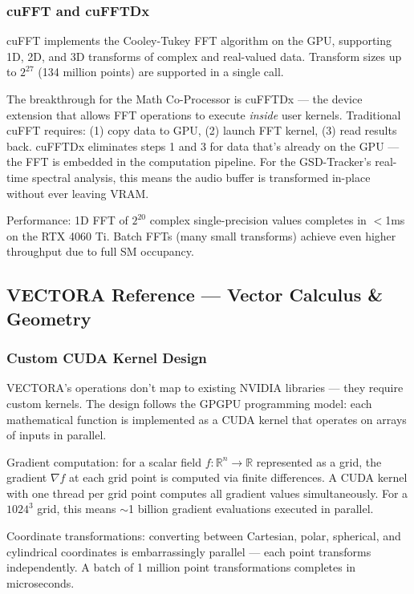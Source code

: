 \documentclass[11pt,letterpaper]{article}
\begin{document}
\subsubsection{cuFFT and cuFFTDx}

cuFFT implements the Cooley-Tukey FFT algorithm on the GPU, supporting 1D, 2D, and 3D transforms of complex and real-valued data. Transform sizes up to $2^{27}$ (134 million points) are supported in a single call.

The breakthrough for the Math Co-Processor is cuFFTDx --- the device extension that allows FFT operations to execute \textit{inside} user kernels. Traditional cuFFT requires: (1) copy data to GPU, (2) launch FFT kernel, (3) read results back. cuFFTDx eliminates steps 1 and 3 for data that's already on the GPU --- the FFT is embedded in the computation pipeline. For the GSD-Tracker's real-time spectral analysis, this means the audio buffer is transformed in-place without ever leaving VRAM.

Performance: 1D FFT of $2^{20}$ complex single-precision values completes in $<$1ms on the RTX 4060 Ti. Batch FFTs (many small transforms) achieve even higher throughput due to full SM occupancy.

\subsection{VECTORA Reference --- Vector Calculus \& Geometry}

\subsubsection{Custom CUDA Kernel Design}

VECTORA's operations don't map to existing NVIDIA libraries --- they require custom kernels. The design follows the GPGPU programming model: each mathematical function is implemented as a CUDA kernel that operates on arrays of inputs in parallel.

Gradient computation: for a scalar field $f: \mathbb{R}^n \rightarrow \mathbb{R}$ represented as a grid, the gradient $\nabla f$ at each grid point is computed via finite differences. A CUDA kernel with one thread per grid point computes all gradient values simultaneously. For a $1024^3$ grid, this means $\sim$1 billion gradient evaluations executed in parallel.

Coordinate transformations: converting between Cartesian, polar, spherical, and cylindrical coordinates is embarrassingly parallel --- each point transforms independently. A batch of 1 million point transformations completes in microseconds.
\end{document}
